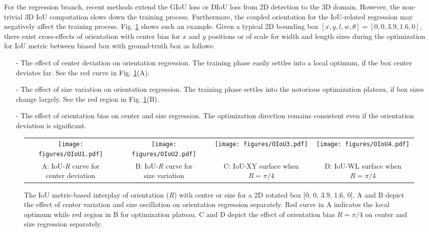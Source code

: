 \documentclass[runningheads]{llncs}
\begin{document}
For the regression branch, recent methods \cite{liang2021rangeioudet,zheng2021se} extend the GIoU \cite{rezatofighi2019generalized} loss or DIoU \cite{zheng2020distance} loss from 2D detection to the 3D domain. 
However, the non-trivial 3D IoU computation slows down the training process. Furthermore, the coupled orientation for the IoU-related regression may negatively affect the training process.
Fig. \ref{fig:orientation} shows such an example. Given a typical 2D bounding box $[x,y,l,w,\theta]=[0, 0, 3.9, 1.6, 0]$, there exist cross-effects of orientation with center bias for $x$ and $y$ positions or of scale for width and length sizes during the optimization for IoU metric between biased box with ground-truth box as follows:
\begin{itemize}
\item[-] The effect of center deviation on orientation regression.  
The training phase easily settles into a local optimum, if the box center deviates far. See the red curve in Fig. \ref{fig:orientation}(A).
\item[-] The effect of size variation on orientation regression. 
The training phase settles into the notorious optimization plateau, if box sizes change largely. See the red region in Fig. \ref{fig:orientation}(B).
\item[-] The effect of orientation bias on center and size regression. The optimization direction remains consistent even if the orientation deviation is significant.
\end{itemize}
\begin{figure}[t]
\centering
\begin{tabular}{cccc}
\texttt{[image: figures/OIoU1.pdf]} & 
\texttt{[image: figures/OIoU2.pdf]} & 
\texttt{[image: figures/OIoU3.pdf]} & 
\texttt{[image: figures/OIoU4.pdf]} \\
\makecell{A: IoU-\textit{R} curve for \\ center deviation} & 
\makecell{B: IoU-\textit{R} curve for \\ size variation} &
\makecell{C: IoU-XY surface \\ when $R=\pi/4$} & 
\makecell{D: IoU-WL surface \\ when $R=\pi/4$} \\
\end{tabular}
\caption{The IoU metric-based interplay of orientation (\textit{R}) with center or size for a 2D rotated box [0, 0, 3.9, 1.6, 0]. A and B depict the effect of center variation and size oscillation on orientation regression separately. Red curve in A indicates the local optimum while red region in B for optimization plateau.
C and D depict the effect of orientation bias $R=\pi/4$ on center and size regression separately.}
\label{fig:orientation}
\end{figure}
\end{document}
